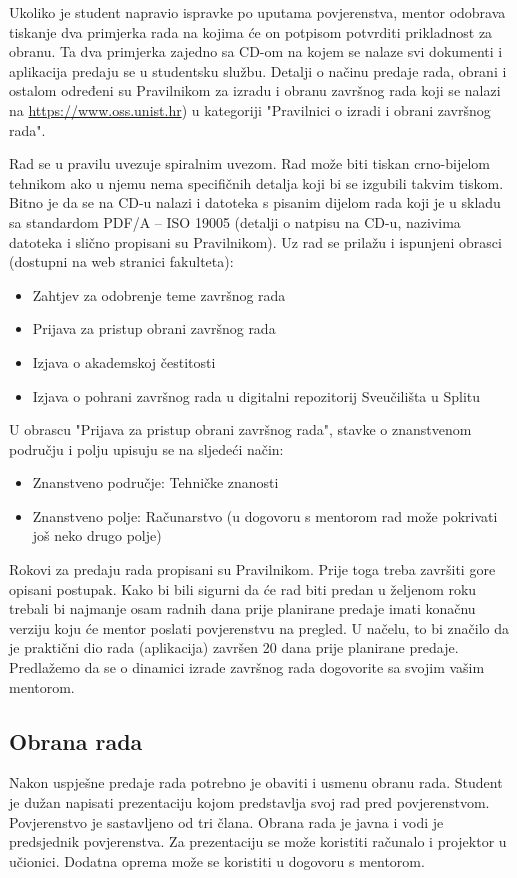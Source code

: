 Ukoliko je student napravio ispravke po uputama povjerenstva, mentor odobrava tiskanje dva primjerka rada na kojima će on potpisom potvrditi prikladnost za obranu. Ta dva primjerka zajedno sa CD-om na kojem se nalaze svi dokumenti i aplikacija predaju se u studentsku službu. Detalji o načinu predaje rada, obrani i ostalom određeni su Pravilnikom za izradu i obranu završnog rada koji se nalazi na \url{https://www.oss.unist.hr}) u kategoriji "Pravilnici o izradi i obrani završnog rada".

Rad se u pravilu uvezuje spiralnim uvezom. Rad može biti tiskan crno-bijelom tehnikom ako u njemu nema specifičnih detalja koji bi se izgubili takvim tiskom. Bitno je da se na CD-u nalazi i datoteka s pisanim dijelom rada koji je u skladu sa standardom PDF/A – ISO 19005 (detalji o natpisu na CD-u, nazivima datoteka i slično propisani su Pravilnikom). Uz rad se prilažu i ispunjeni obrasci (dostupni na web stranici fakulteta):

\begin{itemize}
\item Zahtjev za odobrenje teme završnog rada
\item Prijava za pristup obrani završnog rada
\item Izjava o akademskoj čestitosti
\item Izjava o pohrani završnog rada u digitalni repozitorij Sveučilišta u Splitu 
\end{itemize}

U obrascu "Prijava za pristup obrani završnog rada", stavke o znanstvenom području i polju upisuju se na sljedeći način:
\begin{itemize}
\item Znanstveno područje: Tehničke znanosti
\item Znanstveno polje: Računarstvo (u dogovoru s mentorom rad može pokrivati još neko drugo polje)
\end{itemize}

Rokovi za predaju rada propisani su Pravilnikom. Prije toga treba završiti gore opisani postupak. Kako bi bili sigurni da će rad biti predan u željenom roku trebali bi najmanje osam radnih dana prije planirane predaje imati konačnu verziju koju će mentor poslati povjerenstvu na pregled. U načelu, to bi značilo da je praktični dio rada (aplikacija) završen 20 dana prije planirane predaje. Predlažemo da se o dinamici izrade završnog rada dogovorite sa svojim vašim mentorom.

\subsection{Obrana rada}
Nakon uspješne predaje rada potrebno je obaviti i usmenu obranu rada. Student je dužan napisati prezentaciju kojom predstavlja svoj rad pred povjerenstvom. Povjerenstvo je sastavljeno od tri člana. Obrana rada je javna i vodi je predsjednik povjerenstva. Za prezentaciju se može koristiti računalo i projektor u učionici. Dodatna oprema može se koristiti u dogovoru s mentorom.

